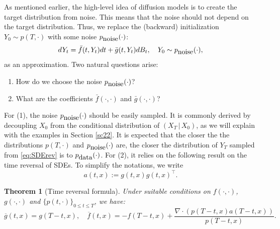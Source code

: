 \documentclass[letterpaper,11pt,reqno]{amsart}
\newtheorem{theorem}{Theorem}[section]
\numberwithin{equation}{section}
\begin{document}
\quad As mentioned earlier, 
the high-level idea of diffusion models is to create
the target distribution from noise.
This means that 
the noise should not depend on the target distribution.
Thus, we replace the (backward) initialization $Y_0 \sim p(T, \cdot)$ 
with some noise $p_{\tiny \mbox{noise}}(\cdot)$:
\begin{equation}
\label{eq:SDErev}
dY_t = \bar{f}(t, Y_t) dt + \bar{g}(t, Y_t ) dB_t, \quad Y_0 \sim p_{\tiny \mbox{noise}}(\cdot),
\end{equation}
as an approximation. Two natural questions arise: 
\begin{enumerate}[itemsep = 3 pt]
\item
How do we choose the noise $p_{\tiny \mbox{noise}}(\cdot)$?
\item
What are the coefficients $\bar{f}(\cdot, \cdot)$ and $\bar{g}(\cdot, \cdot)$?
\end{enumerate}

For (1), the noise $p_{\tiny \mbox{noise}}(\cdot)$ should be easily sampled. It is
commonly derived by 
decoupling $X_0$ from 
the conditional distribution of $(X_T \,|\, X_0)$,
as we will explain with the examples in Section \ref{sc22}. 
It is expected that the closer the the distributions $p(T, \cdot)$ and $p_{\tiny \mbox{noise}}(\cdot)$ are,
the closer the distribution of $Y_T$ sampled from \eqref{eq:SDErev} is to $p_{\tiny \mbox{data}}(\cdot)$.
For (2), it relies on the following result on the time reversal of SDEs.
To simplify the notations, we write 
\begin{equation*}
a(t,x):= g(t,x) g(t,x)^\top.
\end{equation*}

\begin{theorem}[Time reversal formula]
\cite{Ander82, HP86}
\label{thm:SDErev}
Under suitable conditions on $f(\cdot, \cdot)$, $g(\cdot, \cdot)$ and $\{p(t, \cdot)\}_{0 \le t \le T}$, 
we have:
\begin{equation}
\label{eq:coefrev}
\overline{g}(t,x) = g(T-t, x), \quad
\overline{f}(t,x) = -f(T-t, x) + \frac{\nabla \cdot (p(T-t,x) a(T-t,x))}{p(T-t, x)}.
\end{equation}
\end{theorem}
\end{document}

